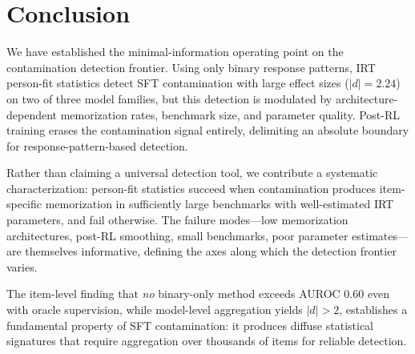 \documentclass[11pt,a4paper]{article}
\begin{document}
\section{Conclusion}
\label{sec:conclusion}

We have established the minimal-information operating point on the contamination detection frontier.
Using only binary response patterns, IRT person-fit statistics detect SFT contamination with large effect sizes ($|d|=2.24$) on two of three model families, but this detection is modulated by architecture-dependent memorization rates, benchmark size, and parameter quality.
Post-RL training erases the contamination signal entirely, delimiting an absolute boundary for response-pattern-based detection.

Rather than claiming a universal detection tool, we contribute a systematic characterization: person-fit statistics succeed when contamination produces item-specific memorization in sufficiently large benchmarks with well-estimated IRT parameters, and fail otherwise.
The failure modes---low memorization architectures, post-RL smoothing, small benchmarks, poor parameter estimates---are themselves informative, defining the axes along which the detection frontier varies.

The item-level finding that \emph{no} binary-only method exceeds AUROC 0.60 even with oracle supervision, while model-level aggregation yields $|d|>2$, establishes a fundamental property of SFT contamination: it produces diffuse statistical signatures that require aggregation over thousands of items for reliable detection.



\end{document}
